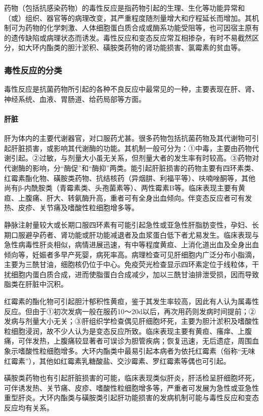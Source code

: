 药物（包括抗感染药物）的毒性反应是指药物引起的生理、生化等功能异常和（或）组织、器官等的病理改变，其严重程度随剂量增大和疗程延长而增加。其机制可为药物的化学刺激、人体细胞蛋白质合成或酶系功能受阻等，也可因宿主原有的遗传缺陷或病理状态而诱发。毒性反应和变态反应常互相掺杂，有时不易截然区分，如大环内酯类的胆汁淤积、磺胺类药物的肾功能损害、氯霉素的贫血等。

\subsubsection{毒性反应的分类}

毒性反应是抗菌药物所引起的各种不良反应中最常见的一种，主要表现在肝、肾、神经系统、血液、胃肠道、给药局部等方面。
\paragraph{肝脏}

肝为体内的主要代谢器官，对口服药尤甚。很多药物包括抗菌药物及其代谢物可引起肝脏损害，或影响其代谢酶的功能。其机制一般可分为：①中毒，主要由药物代谢引起。②过敏，与剂量大小虽无关系，但剂量大者的发生率有时较高。③药物对代谢酶的影响，分“酶促”和“酶抑”两类。能引起肝脏损害的药物主要有四环素类、红霉素酯化物、磺胺类药物、抗结核药（异烟肼、利福平等）、呋喃唑酮等，其他尚有β-内酰胺类（青霉素类、头孢菌素等）、两性霉素B等。临床表现主要有黄疸、上腹痛、肝大、转氨酶升高，重者可有全身出血倾向。伴变态反应者可有发热、皮疹、关节痛及嗜酸性粒细胞增多等。

静脉注射量较大或长期口服四环素有可能引起急性或亚急性肝脂肪变性，孕妇、长期口服避孕药者、肾功能或肝功能减退者及血浆蛋白低下者尤易发生。临床表现与急性病毒性肝炎相似，病情进展迅速，有中等程度黄疸、上消化道出血及全身出血倾向等，妊娠者多早产死婴，病死率高。病理检查可见肝细胞内广泛分布小脂滴，主要为三酰甘油，细胞核仍位于中心。免疫荧光检查显示四环素定位于线粒体，干扰细胞内蛋白质合成，进而使脂蛋白合成减少，加以三酰甘油排泄受损，因而导致脂类在肝脏中沉积。

红霉素的酯化物可引起胆汁郁积性黄疸，鉴于其发生率较高，因此有人认为属毒性反应。但由于①初次发病一般在服药10～20d以后，再次用药则发病时间提前；②发病与剂量大小无关；③肝组织学检查偶见肝细胞坏死，主要为胆汁淤积及嗜酸性粒细胞浸润，故不少人认为是变态反应所致。临床表现主要有黄疸、瘙痒、上腹痛，可伴发热，上腹痛较显著者可误诊为胆管疾病；恢复迅速，无后遗症，周围血象示嗜酸性粒细胞增多。大环内酯类中最易引起本病者为依托红霉素（俗称“无味红霉素”），其他如红霉素乳糖酸盐、交沙霉素、罗红霉素等偶也可引起。

磺胺类药物也有引起肝脏损害的可能，临床表现类似肝炎，肝活检呈肝细胞坏死，可伴诱发热、关节痛、皮疹、嗜酸性粒细胞增多等，严重者可发展为急性或亚急性重型肝炎。大环内酯类与磺胺类引起肝功能损害的发病机制可能与毒性反应和变态反应均有关系。

